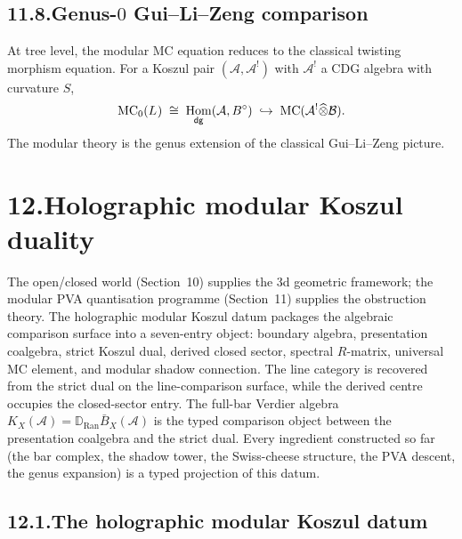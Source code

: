 \documentclass[11pt]{report}
\theoremstyle{definition}
\theoremstyle{remark}
\providecommand{\cA}{\mathcal{A}}
\providecommand{\cB}{\mathcal{B}}
\providecommand{\Ran}{\mathrm{Ran}}
\providecommand{\MC}{\mathrm{MC}}
\let\mod\relax
\newcommand{\mod}{\mathrm{mod}}
\DeclareMathOperator{\Hom}{Hom}
\numberwithin{equation}{section}
\begin{document}
\subsection*{11.8.\enspace Genus-$0$ Gui--Li--Zeng comparison}

At tree level, the modular MC equation reduces to the
classical twisting morphism equation. For a Koszul pair
$(\cA, \cA^!)$ with $\cA^!$ a CDG algebra with curvature $S$,
\[
\MC_0(L_{\mod})
\;\cong\;
\Hom_{\mathsf{dg}}(\cA, B^\circ)
\;\hookrightarrow\;
\MC(\cA^! \widehat\otimes \cB).
\]
The modular theory is the genus extension of the classical
Gui--Li--Zeng picture.


\section*{12.\quad Holographic modular Koszul duality}

The open/closed world (Section~10) supplies the 3d geometric
framework; the modular PVA quantisation programme
(Section~11) supplies the obstruction theory. The holographic
modular Koszul datum packages the algebraic comparison surface into
a seven-entry object: boundary algebra, presentation coalgebra,
strict Koszul dual, derived closed sector,
spectral $R$-matrix,
universal MC element, and modular shadow connection. The line
category is recovered from the strict dual on the line-comparison
surface, while the derived centre occupies the closed-sector entry.
The full-bar Verdier algebra
$K_X(\cA)=\mathbb D_{\Ran}\bar B_X(\cA)$ is the typed comparison
object between the presentation coalgebra and the strict dual. Every ingredient
constructed so far (the bar complex, the shadow tower, the
Swiss-cheese structure, the PVA descent, the genus expansion) is a
typed projection of this datum.

\subsection*{12.1.\enspace The holographic modular Koszul datum}
\end{document}
